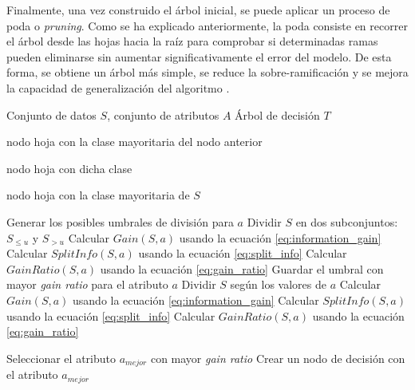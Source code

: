 Finalmente, una vez construido el árbol inicial, se puede aplicar un proceso de poda o \textit{pruning}. Como se ha explicado anteriormente, la poda consiste en recorrer el árbol desde las hojas hacia la raíz para comprobar si determinadas ramas pueden eliminarse sin aumentar significativamente el error del modelo. De esta forma, se obtiene un árbol más simple, se reduce la sobre-ramificación y se mejora la capacidad de generalización del algoritmo \cite{1997AnalysisPruning,1989ComparativePruning,quinlan1987simplifying}.


\begin{algorithm}[H]
\caption{Pseudocódigo del algoritmo C4.5}
\label{alg}
\begin{algorithmic}[1]
\Require Conjunto de datos $S$, conjunto de atributos $A$
\Ensure Árbol de decisión $T$


    \State \Return nodo hoja con la clase mayoritaria del nodo anterior
\EndIf

    \State \Return nodo hoja con dicha clase
\EndIf

    \State \Return nodo hoja con la clase mayoritaria de $S$
\EndIf

        \State Generar los posibles umbrales de división para $a$
            \State Dividir $S$ en dos subconjuntos: $S_{\leq u}$ y $S_{>u}$
            \State Calcular $Gain(S,a)$ usando la ecuación \ref{eq:information_gain}
            \State Calcular $SplitInfo(S,a)$ usando la ecuación \ref{eq:split_info}
            \State Calcular $GainRatio(S,a)$ usando la ecuación \ref{eq:gain_ratio}
        \EndFor
        \State Guardar el umbral con mayor \textit{gain ratio} para el atributo $a$
    \Else
        \State Dividir $S$ según los valores de $a$
        \State Calcular $Gain(S,a)$ usando la ecuación \ref{eq:information_gain}
        \State Calcular $SplitInfo(S,a)$ usando la ecuación \ref{eq:split_info}
        \State Calcular $GainRatio(S,a)$ usando la ecuación \ref{eq:gain_ratio}
    \EndIf
\EndFor

\State Seleccionar el atributo $a_{mejor}$ con mayor \textit{gain ratio}
\State Crear un nodo de decisión con el atributo $a_{mejor}$


\end{algorithmic}
\end{algorithm}

